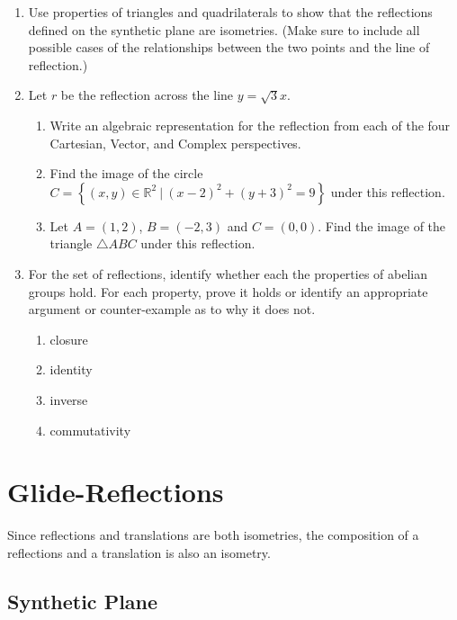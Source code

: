 \documentclass[
]{book}
\providecommand{\tightlist}{%
  \setlength{\itemsep}{0pt}\setlength{\parskip}{0pt}}
\let\stdsection\section
\renewcommand\section{\newpage\stdsection}
\theoremstyle{definition}
\theoremstyle{definition}
\theoremstyle{definition}
\theoremstyle{definition}
\theoremstyle{remark}
\begin{document}
\begin{enumerate}
\def\labelenumi{\arabic{enumi}.}
\item
  Use properties of triangles and quadrilaterals to show that the reflections defined on the synthetic plane are isometries. (Make sure to include all possible cases of the relationships between the two points and the line of reflection.)
\item
  Let \(r\) be the reflection across the line \(y=\sqrt{3}x\).

  \begin{enumerate}
  \def\labelenumii{\alph{enumii}.}
  \tightlist
  \item
    Write an algebraic representation for the reflection from each of the four Cartesian, Vector, and Complex perspectives.
  \item
    Find the image of the circle \(C=\left\{ (x,y)\in \mathbb{R}^2 \: \vert \: (x-2)^2+(y+3)^2 =9\right\}\) under this reflection.
  \item
    Let \(A=(1,2)\), \(B=(-2,3)\) and \(C=(0,0)\). Find the image of the triangle \(\triangle ABC\) under this reflection.
  \end{enumerate}
\item
  For the set of reflections, identify whether each the properties of abelian groups hold. For each property, prove it holds or identify an appropriate argument or counter-example as to why it does not.

  \begin{enumerate}
  \def\labelenumii{\alph{enumii}.}
  \tightlist
  \item
    closure
  \item
    identity
  \item
    inverse
  \item
    commutativity
  \end{enumerate}
\end{enumerate}

\hypertarget{glide-reflections}{%
\section{Glide-Reflections}\label{glide-reflections}}

Since reflections and translations are both isometries, the composition of a reflections and a translation is also an isometry.

\hypertarget{synthetic-plane-4}{%
\subsection{Synthetic Plane}\label{synthetic-plane-4}}
\end{document}
